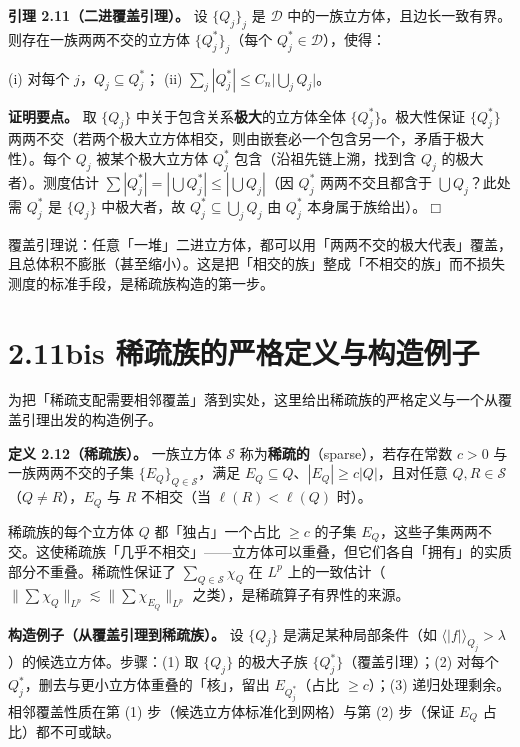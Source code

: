 \documentclass[a4paper,11pt,openany]{ctexbook}
\numberwithin{equation}{chapter}
\numberwithin{figure}{chapter}
\numberwithin{table}{chapter}
\begin{document}
\textbf{引理 2.11（二进覆盖引理）。} 设 $\{Q_j\}_{j}$ 是 $\mathcal D$ 中的一族立方体，且边长一致有界。则存在一族两两不交的立方体 $\{Q_j^*\}_j$（每个 $Q_j^*\in\mathcal D$），使得：

(i) 对每个 $j$，$Q_j\subseteq Q_j^*$；
(ii) $\sum_j|Q_j^*|\le C_n\bigl|\bigcup_j Q_j\bigr|$。

\textbf{证明要点。} 取 $\{Q_j\}$ 中关于包含关系\textbf{极大}的立方体全体 $\{Q_j^*\}$。极大性保证 $\{Q_j^*\}$ 两两不交（若两个极大立方体相交，则由嵌套必一个包含另一个，矛盾于极大性）。每个 $Q_j$ 被某个极大立方体 $Q_j^*$ 包含（沿祖先链上溯，找到含 $Q_j$ 的极大者）。测度估计 $\sum|Q_j^*|=|\bigcup Q_j^*|\le|\bigcup Q_j|$（因 $Q_j^*$ 两两不交且都含于 $\bigcup Q_j$？此处需 $Q_j^*$ 是 $\{Q_j\}$ 中极大者，故 $Q_j^*\subseteq\bigcup_j Q_j$ 由 $Q_j^*$ 本身属于族给出）。$\Box$

\begin{intuitionbox}
覆盖引理说：任意「一堆」二进立方体，都可以用「两两不交的极大代表」覆盖，且总体积不膨胀（甚至缩小）。这是把「相交的族」整成「不相交的族」而不损失测度的标准手段，是稀疏族构造的第一步。
\end{intuitionbox}

\section{2.11bis 稀疏族的严格定义与构造例子}

为把「稀疏支配需要相邻覆盖」落到实处，这里给出稀疏族的严格定义与一个从覆盖引理出发的构造例子。

\textbf{定义 2.12（稀疏族）。} 一族立方体 $\mathcal S$ 称为\textbf{稀疏的}（sparse），若存在常数 $c>0$ 与一族两两不交的子集 $\{E_Q\}_{Q\in\mathcal S}$，满足 $E_Q\subseteq Q$、$|E_Q|\ge c|Q|$，且对任意 $Q,R\in\mathcal S$（$Q\neq R$），$E_Q$ 与 $R$ 不相交（当 $\ell(R)<\ell(Q)$ 时）。

\begin{intuitionbox}
稀疏族的每个立方体 $Q$ 都「独占」一个占比 $\ge c$ 的子集 $E_Q$，这些子集两两不交。这使稀疏族「几乎不相交」——立方体可以重叠，但它们各自「拥有」的实质部分不重叠。稀疏性保证了 $\sum_{Q\in\mathcal S}\chi_Q$ 在 $L^p$ 上的一致估计（$\|\sum\chi_Q\|_{L^p}\lesssim\|\sum\chi_{E_Q}\|_{L^p}$ 之类），是稀疏算子有界性的来源。
\end{intuitionbox}

\textbf{构造例子（从覆盖引理到稀疏族）。} 设 $\{Q_j\}$ 是满足某种局部条件（如 $\langle|f|\rangle_{Q_j}>\lambda$）的候选立方体。步骤：(1) 取 $\{Q_j\}$ 的极大子族 $\{Q_j^*\}$（覆盖引理）；(2) 对每个 $Q_j^*$，删去与更小立方体重叠的「核」，留出 $E_{Q_j^*}$（占比 $\ge c$）；(3) 递归处理剩余。相邻覆盖性质在第 (1) 步（候选立方体标准化到网格）与第 (2) 步（保证 $E_Q$ 占比）都不可或缺。
\end{document}
